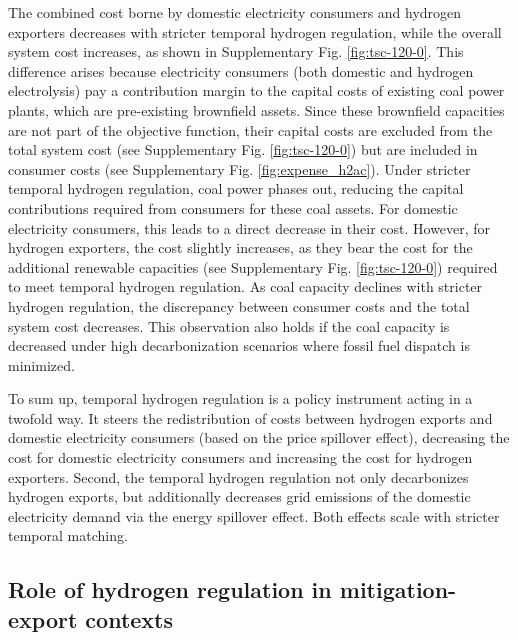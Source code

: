 \documentclass[5p,numafflabel]{elsarticle}
\newcommand{\co}{\ce{CO2}~}
\def\co{CO${}_2${\:}}
\begin{document}
The combined cost borne by domestic electricity consumers and hydrogen exporters decreases with stricter temporal hydrogen regulation, while the overall system cost increases, as shown in Supplementary Fig. \ref{fig:tsc-120-0}. 
This difference arises because electricity consumers (both domestic and hydrogen electrolysis) pay a contribution margin to the capital costs of existing coal power plants, which are pre-existing brownfield assets. Since these brownfield capacities are not part of the objective function, their capital costs are excluded from the total system cost (see Supplementary Fig. \ref{fig:tsc-120-0}) but are included in consumer costs (see Supplementary Fig. \ref{fig:expense_h2ac}).
Under stricter temporal hydrogen regulation, coal power phases out, reducing the capital contributions required from consumers for these coal assets. For domestic electricity consumers, this leads to a direct decrease in their cost. However, for hydrogen exporters, the cost slightly increases, as they bear the cost for the additional renewable capacities (see Supplementary Fig. \ref{fig:tsc-120-0}) required to meet temporal hydrogen regulation. As coal capacity declines with stricter hydrogen regulation, the discrepancy between consumer costs and the total system cost decreases. This observation also holds if the coal capacity is decreased under high decarbonization scenarios where fossil fuel dispatch is minimized.



To sum up, temporal hydrogen regulation is a policy instrument acting in a twofold way. It steers the redistribution of costs between hydrogen exports and domestic electricity consumers (based on the price spillover effect), decreasing the cost for domestic electricity consumers and increasing the cost for hydrogen exporters. 
Second, the temporal hydrogen regulation 
not only decarbonizes hydrogen exports, but additionally decreases grid emissions of the domestic electricity demand via the energy spillover effect. Both effects scale with stricter temporal matching.



\subsection*{Role of hydrogen regulation in mitigation-export contexts}
\label{subsec:rule_all}
\end{document}
